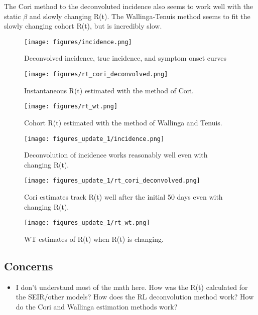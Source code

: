 \documentclass{article}
\begin{document}
The Cori method to the deconvoluted incidence also seems to work well with the static $\beta$ and slowly changing R(t). The Wallinga-Tenuis method seems to fit the slowly changing cohort R(t), but is incredibly slow.

\begin{figure}[h!]
    \centering
    \texttt{[image: figures/incidence.png]}
    \caption{Deconvolved incidence, true incidence, and symptom onset curves}
    \label{fig:my_label}
\end{figure}

\begin{figure}[h!]
    \centering
    \texttt{[image: figures/rt\_cori\_deconvolved.png]}
    \caption{Instantaneous R(t) estimated with the method of Cori.}
    \label{fig:my_label}
\end{figure}

\begin{figure}[h!]
    \centering
    \texttt{[image: figures/rt\_wt.png]}
    \caption{Cohort R(t) estimated with the method of Wallinga and Tenuis.}
    \label{fig:my_label}
\end{figure}

\begin{figure}[h!]
    \centering
    \texttt{[image: figures\_update\_1/incidence.png]}
    \caption{Deconvolution of incidence works reasonably well even with changing R(t).}
    \label{fig:my_label}
\end{figure}

\begin{figure}[h!]
    \centering
    \texttt{[image: figures\_update\_1/rt\_cori\_deconvolved.png]}
    \caption{Cori estimates track R(t) well after the initial 50 days even with changing R(t).}
    \label{fig:my_label}
\end{figure}

\begin{figure}[h!]
    \centering
    \texttt{[image: figures\_update\_1/rt\_wt.png]}
    \caption{WT estimates of R(t) when R(t) is changing.}
    \label{fig:my_label}
\end{figure}

\subsection{Concerns}
\begin{itemize}
    \item I don't understand most of the math here. How was the R(t) calculated for the SEIR/other models? How does the RL deconvolution method work? How do the Cori and Wallinga estimation methods work?
\end{itemize}
\end{document}
